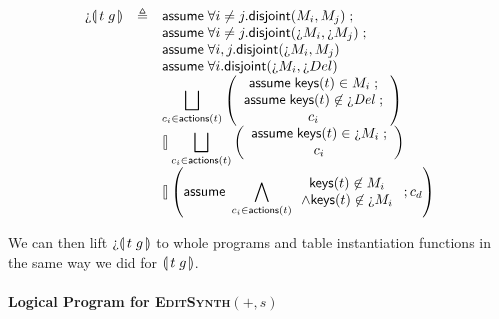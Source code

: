 \[\begin{array}{lcl}
    \hole\parenbb{t\; g}
    & \triangleq
    & \assume{\forall i\neq j. \textsf{disjoint}(M_i,M_j)}; \\
    && \assume{\forall i\neq j. \textsf{disjoint}(\hole M_i,\hole M_j)};\\
    && \assume{\forall i,j. \textsf{disjoint}(\hole M_i, M_j)} \\
    && \assume{\forall i. \textsf{disjoint}(\hole M_i, \hole{Del})} \\
    && \displaystyle \Angel_{c_i \in \actions t}
       \left(\begin{array}{c}
         \assume{\keys t \in M_i}; \\
         \assume{\keys t \not\in \hole{\mathit{Del}}};\\
         c_i \\
       \end{array}\right)\\
    && \angel \displaystyle \Angel_{c_i \in \actions t}
       \left(\begin{array}{c}
               \assume{\keys t \in \hole{M_i}}; \\
               c_i \\
             \end{array}\right)\\
    && \displaystyle \angel \left(\assume{\bigwedge_{c_i \in \actions t}
       \begin{array}{c}
         \keys t \not\in M_i\\
         \wedge \keys t \not\in \hole M_i
       \end{array}}; c_d\right)
\end{array}\]


We can then lift $\hole\parenbb{t\; g}$ to whole programs and table
instantiation functions in the same way we did for $\llparenthesis\, t\; g\, \rrparenthesis$.



\paragraph{Logical Program for \textsc{EditSynth}$(+,s)$}

